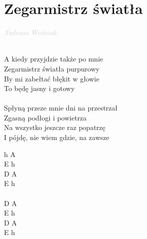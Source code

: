 \documentclass[a5paper, 10pt]{book}
\begin{document}
\section{Zegarmistrz światła}\textcolor{lightgray}{\textit{Tadeusz Woźniak}}\\~\\
\begin{minipage}[t]{0.7\textwidth}
A kiedy przyjdzie także po mnie\\
Zegarmistrz światła purpurowy\\
By mi zabełtać błękit w głowie\\
To będę jasny i gotowy\\
\\
Spłyną przeze mnie dni na przestrzał\\
Zgasną podłogi i powietrza\\
Na wszystko jeszcze raz popatrzę\\
I pójdę, nie wiem gdzie, na zawsze\\
\end{minipage}
\begin{minipage}[t]{0.3\textwidth}
h A\\
E h\\
D A\\
E h\\
\\
D A\\
E h\\
D A\\
E h\\
\end{minipage}

\newpage
\end{document}
